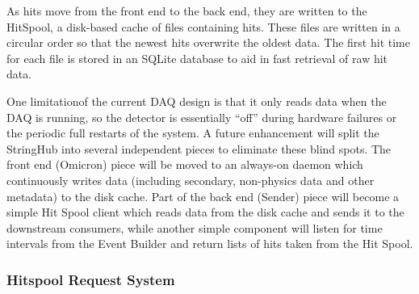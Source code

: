 

As hits move from the front end to the back end, they are written to the
HitSpool, a disk-based cache of files containing hits.  These files are
written in a circular order so that the newest hits overwrite the oldest data.
The first hit time for each file is stored in an SQLite database to aid in fast
retrieval of raw hit data.

One limitationof the current DAQ design is that it only reads data when the
DAQ is running, so the detector is essentially ``off'' during hardware failures
or the periodic full restarts of the system.  A future enhancement will split
the StringHub into several independent pieces to eliminate these blind spots.
The front end (Omicron) piece will be moved to an always-on daemon which
continuously writes data (including secondary, non-physics data and other
metadata) to the disk cache.  Part of the back end (Sender) piece will become a
simple Hit Spool client which reads data from the disk cache and sends it to
the downstream consumers, while another simple component will listen for time
intervals from the Event Builder and return lists of hits taken from the
Hit Spool.

\subsubsection{\label{sect:hitspool}Hitspool Request System}

